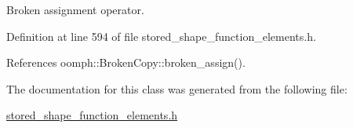 Broken assignment operator. 



Definition at line 594 of file stored\+\_\+shape\+\_\+function\+\_\+elements.\+h.



References oomph\+::\+Broken\+Copy\+::broken\+\_\+assign().



The documentation for this class was generated from the following file\+:\begin{DoxyCompactItemize}
\item 
\hyperlink{stored__shape__function__elements_8h}{stored\+\_\+shape\+\_\+function\+\_\+elements.\+h}\end{DoxyCompactItemize}
